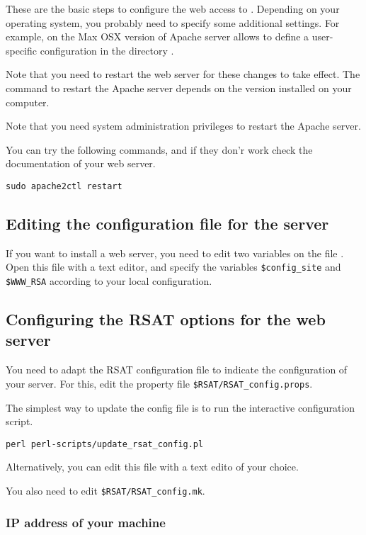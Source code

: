 \documentclass[12pt,a4paper, twoside]{scrreprt} %
\begin{document}
These are the basic steps to configure the web access to
\RSAT. Depending on your operating system, you probably need to
specify some additional settings. For example, on the Max OSX version
of Apache server allows to define a user-specific configuration in the
directory .

Note that you need to restart the web server for these changes to take
effect. The command to restart the Apache server depends on the
version installed on your computer. 

Note that you need system administration privileges to restart the
Apache server.

You can try the following commands, and if they don'r work check the
documentation of your web server.

\begin{lstlisting}
sudo apache2ctl restart
\end{lstlisting}

\subsection{Editing the configuration file for the \RSAT server}

If you want to install a web server, you need to edit two variables on
the file . Open this file with a text editor, and
specify the variables \texttt{\$config\_site} and \texttt{\$WWW\_RSA}
according to your local configuration.

\subsection{Configuring the RSAT options for the web server}

You need to adapt the RSAT configuration file to indicate the
configuration of your server. For this, edit the \RSAT property file
\texttt{\$RSAT/RSAT\_config.props}.

The simplest way to update the config file is to run the interactive
configuration script.

\begin{lstlisting}
perl perl-scripts/update_rsat_config.pl
\end{lstlisting}

Alternatively, you can edit this file with a text edito of your
choice.

You also need to edit \texttt{\$RSAT/RSAT\_config.mk}. 

\subsubsection{IP address of your machine}
\end{document}
